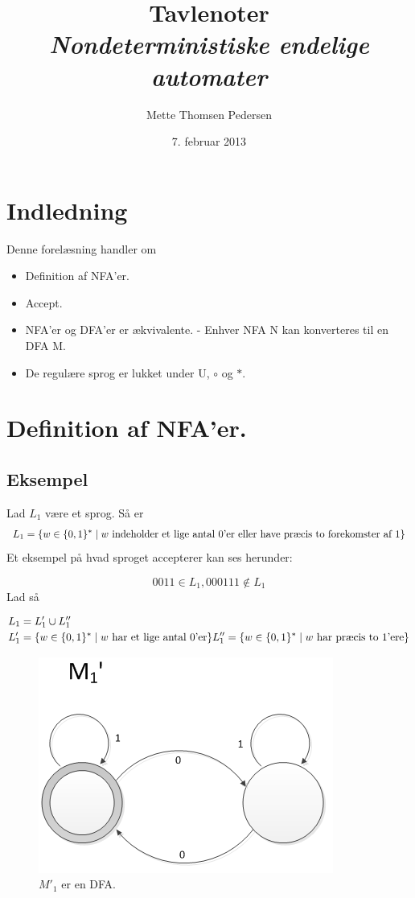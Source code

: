 \documentclass[a4paper,10pt,article]{memoir}
\title{Tavlenoter \\ \emph{Nondeterministiske endelige automater}}
\author{Mette Thomsen Pedersen}
\date{7. februar 2013}
\begin{document}
\maketitle

\tableofcontents*

\chapter{Indledning}

Denne forelæsning handler om

\begin{itemize}
\item Definition af NFA'er.
\item Accept.
\item NFA'er og DFA'er er ækvivalente. - Enhver NFA N kan konverteres til en DFA M.
\item De regulære sprog er lukket under U, $\circ$ og $\ast$.

\end{itemize}

\chapter{Definition af NFA'er.}
\section*{Eksempel}

Lad $L_1$ være et sprog. Så er
\[ L_1 = \{ w \in \{ 0,1 \}^{\ast} \mid  w \text{ indeholder et lige antal 0'er eller have præcis to forekomster af 1}  \}\]
%
Et eksempel på hvad sproget accepterer kan ses herunder:

\[ 0011 \in L_1, 000111 \notin L_1 \]
Lad så

\begin{align*}
L_1 & = L_1' \cup L_1'' \\
L_1' & = \{ w \in \{ 0,1 \}^{\ast} \mid  w \text{ har et lige antal 0'er} \}
L_1'' = \{ w \in \{ 0,1 \}^{\ast} \mid  w \text{ har præcis to 1'ere} \}
\end{align*}

\begin{figure}[h]
\centering
\includegraphics[scale=0.8]{figur1.png}
\caption{$M'_1$ er en DFA.}
\label{fig:1}
\end{figure}
\end{document}
